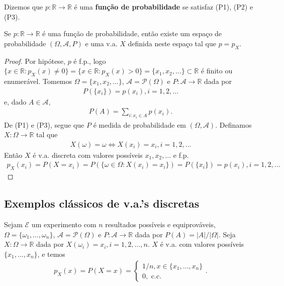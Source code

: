 \documentclass[../Notas.tex]{subfiles}
\begin{document}
\begin{definition}
Dizemos que $p:\mathbb{R}\to\mathbb{R}$ é uma \textbf{função de probabilidade} se satisfaz (P1), (P2) e (P3).
\end{definition}

\begin{proposition}
Se $p:\mathbb{R}\to\mathbb{R}$ é uma função de probabilidade, então existe um espaço de probabilidade $(\Omega, \mathcal{A}, P)$ e uma v.a. $X$ definida neste espaço tal que $p=p_X$.
\end{proposition}

\begin{proof}
Por hipótese, $p$ é f.p., logo $\{ x\in\mathbb{R} : p_X(x) \neq 0 \} = \{ x\in\mathbb{R} : p_X(x) > 0 \} = \{ x_1, x_2, \dots \}\subset\mathbb{R}$ é finito ou enumerável. Tomemos $\Omega = \{ x_1, x_2, \dots \}$, $\mathcal{A} = \mathcal{P}(\Omega)$ e $P:\mathcal{A}\to\mathbb{R}$ dada por
\begin{align*}
    P(\{x_i\}) = p(x_i), i = 1, 2, \dots
\end{align*}
e, dado $A\in\mathcal{A}$,
\begin{align*}
    P(A) = \sum_{i : x_i\in A} p(x_i).
\end{align*}
De (P1) e (P3), segue que $P$ é medida de probabilidade em $(\Omega, \mathcal{A})$. Definamos $X:\Omega\to\mathbb{R}$ tal que
\begin{align*}
    X(\omega) = \omega \Longleftrightarrow X(x_i) = x_i, i=1,2,\dots
\end{align*}
Então $X$ é v.a. discreta com valores possíveis $x_1, x_2, \dots$ e f.p.
\begin{align*}
    p_X(x_i) = P(X=x_i) = P(\{ \omega\in\Omega : X(x_i) = x_i \}) = P(\{x_i\}) = p(x_i), i = 1,2, \dots
\end{align*}
\end{proof}

\subsection{Exemplos clássicos de v.a.'s discretas}
\begin{example}
Sejam $\mathcal{E}$ um experimento com $n$ resultados possíveis e equiprováveis, $\Omega = \{ \omega_1, \dots, \omega_n \}$, $\mathcal{A} = \mathcal{P}(\Omega)$ e $P:\mathcal{A}\to\mathbb{R}$ dada por $P(A) = |A|/|\Omega|$. Seja $X:\Omega\to\mathbb{R}$ dada por $X(\omega_i) = x_i, i = 1, 2, \dots, n$. $X$ é v.a. com valores possíveis $\{x_1, \dots, x_n\}$, e temos
\begin{align*}
    p_X(x) = P(X=x) = \begin{cases}
    1/n, x\in\{x_1, \dots, x_n\} \\
    0, \text{ c.c.}
    \end{cases}.
\end{align*}
\end{example}
\end{document}
